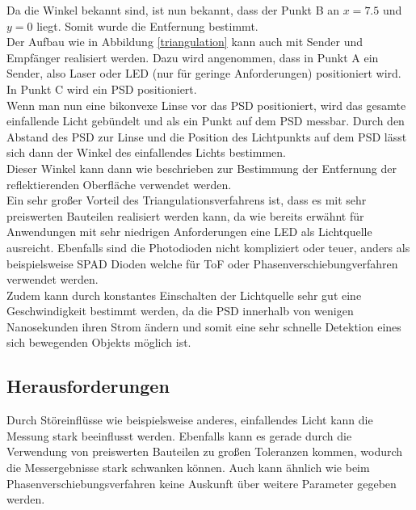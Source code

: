 Da die Winkel bekannt sind, ist nun bekannt, dass der Punkt B an $x = 7.5$ und $y = 0$ liegt. Somit wurde die Entfernung bestimmt.\\
Der Aufbau wie in Abbildung \ref{triangulation} kann auch mit Sender und Empfänger realisiert werden. Dazu wird angenommen, dass in Punkt A ein Sender, also Laser oder \ac{LED} (nur für geringe Anforderungen) positioniert wird. In Punkt C wird ein \ac{PSD} positioniert.\\
Wenn man nun eine bikonvexe Linse vor das \ac{PSD} positioniert, wird das gesamte einfallende Licht gebündelt und als ein Punkt auf dem \ac{PSD} messbar.
Durch den Abstand des \ac{PSD} zur Linse und die Position des Lichtpunkts auf dem \ac{PSD} lässt sich dann der Winkel des einfallendes Lichts bestimmen.\\
Dieser Winkel kann dann wie beschrieben zur Bestimmung der Entfernung der reflektierenden Oberfläche verwendet werden. \\
\newpage
Ein sehr großer Vorteil des Triangulationsverfahrens ist, dass es mit sehr preiswerten Bauteilen realisiert werden kann, da wie bereits erwähnt für Anwendungen mit sehr niedrigen Anforderungen eine \ac{LED} als Lichtquelle ausreicht. Ebenfalls sind die Photodioden nicht kompliziert oder teuer, anders als beispielsweise \ac{SPAD} Dioden welche für \ac{ToF} oder Phasenverschiebungverfahren verwendet werden.\\
Zudem kann durch konstantes Einschalten der Lichtquelle sehr gut eine Geschwindigkeit bestimmt werden, da die \ac{PSD} innerhalb von wenigen Nanosekunden ihren Strom ändern und somit eine sehr schnelle Detektion eines sich bewegenden Objekts möglich ist. \cite{triangulation}\cite{psd}
\subsection{Herausforderungen}
Durch Störeinflüsse wie beispielsweise anderes, einfallendes Licht kann die Messung stark beeinflusst werden. Ebenfalls kann es gerade durch die Verwendung von preiswerten Bauteilen zu großen Toleranzen kommen, wodurch die Messergebnisse stark schwanken können. Auch kann ähnlich wie beim Phasenverschiebungsverfahren keine Auskunft über weitere Parameter gegeben werden. 